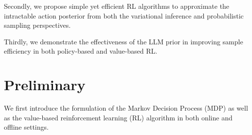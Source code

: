 \documentclass{article} %
\theoremstyle{plain}
\theoremstyle{definition}
\theoremstyle{remark}
\begin{document}
Secondly, we propose simple yet efficient RL algorithms to approximate the intractable action posterior from both the variational inference and probabilistic sampling perspectives.

Thirdly, we demonstrate the effectiveness of the LLM prior in improving sample efficiency in both policy-based and value-based RL.
\fi

\iffalse

\section{Preliminary}
\label{pre}
We first introduce the formulation of the Markov Decision Process (MDP) as well as the value-based reinforcement learning (RL) algorithm in both online and offline settings.


\end{document}
